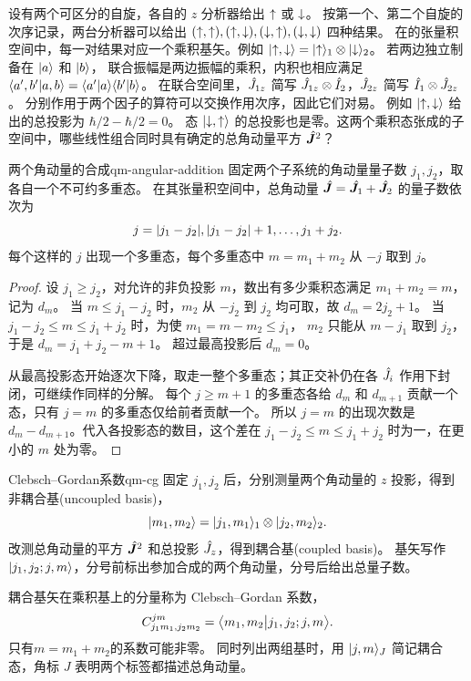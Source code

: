 设有两个可区分的自旋，各自的 $z$ 分析器给出 $\mathord{\uparrow}$ 或 $\mathord{\downarrow}$。
按第一个、第二个自旋的次序记录，两台分析器可以给出 $(\mathord{\uparrow},\mathord{\uparrow}),(\mathord{\uparrow},\mathord{\downarrow}),(\mathord{\downarrow},\mathord{\uparrow}),(\mathord{\downarrow},\mathord{\downarrow})$ 四种结果。
在的张量积空间中，每一对结果对应一个乘积基矢。例如 $\lvert\mathord{\uparrow},\mathord{\downarrow}\rangle = \lvert\mathord{\uparrow}\rangle_1 \otimes \lvert\mathord{\downarrow}\rangle_2$。
若两边独立制备在 $\lvert a\rangle$ 和 $\lvert b\rangle$，
联合振幅是两边振幅的乘积，内积也相应满足
$\langle a',b'\vert a,b\rangle = \langle a'\vert a\rangle\langle b'\vert b\rangle$。
在联合空间里，$\hat{J}_{1z}$ 简写 $\hat{J}_{1z} \otimes \hat{I}_2$，$\hat{J}_{2z}$ 简写 $\hat{I}_1 \otimes \hat{J}_{2z}$。
分别作用于两个因子的算符可以交换作用次序，因此它们对易。
例如 $\lvert\mathord{\uparrow},\mathord{\downarrow}\rangle$ 给出的总投影为 $\hbar/2 - \hbar/2 = 0$。
态 $\lvert\mathord{\downarrow},\mathord{\uparrow}\rangle$ 的总投影也是零。这两个乘积态张成的子空间中，哪些线性组合同时具有确定的总角动量平方 $\hat{\bm{J}}^2$？
\begin{theorem}{两个角动量的合成}{qm-angular-addition}
    固定两个子系统的角动量量子数 $j_1,j_2$，取各自一个不可约多重态。
    在其张量积空间中，总角动量 $\hat{\bm{J}} = \hat{\bm{J}}_1 + \hat{\bm{J}}_2$ 的量子数依次为
    \begin{equation}
        j = \lvert j_1 - j_2\rvert,\lvert j_1 - j_2\rvert + 1,\ldots,j_1 + j_2 .
    \end{equation}
    每个这样的 $j$ 出现一个多重态，每个多重态中 $m = m_1 + m_2$ 从 $-j$ 取到 $j$。
\end{theorem}
\begin{proof}
    设 $j_1 \geq j_2$，对允许的非负投影 $m$，数出有多少乘积态满足 $m_1 + m_2 = m$，记为 $d_m$。
    当 $m \leq j_1 - j_2$ 时，$m_2$ 从 $-j_2$ 到 $j_2$ 均可取，故 $d_m = 2j_2 + 1$。
    当 $j_1 - j_2 \leq m \leq j_1 + j_2$ 时，为使 $m_1 = m - m_2 \leq j_1$，
    $m_2$ 只能从 $m - j_1$ 取到 $j_2$，于是 $d_m = j_1 + j_2 - m + 1$。
    超过最高投影后 $d_m = 0$。

    从最高投影态开始逐次下降，取走一整个多重态；其正交补仍在各 $\hat{J}_i$ 作用下封闭，可继续作同样的分解。
    每个 $j \geq m + 1$ 的多重态各给 $d_m$ 和 $d_{m+1}$ 贡献一个态，只有 $j = m$ 的多重态仅给前者贡献一个。
    所以 $j = m$ 的出现次数是 $d_m - d_{m+1}$。代入各投影态的数目，这个差在 $j_1 - j_2 \leq m \leq j_1 + j_2$ 时为一，在更小的 $m$ 处为零。
\end{proof}

\begin{definition}{Clebsch--Gordan系数}{qm-cg}
    固定 $j_1,j_2$ 后，分别测量两个角动量的 $z$ 投影，得到非耦合基(uncoupled basis)，
    \begin{equation}\label{eq:qm-uncoupled-angular-momentum-basis}
        \lvert m_1,m_2\rangle = \lvert j_1,m_1\rangle_1 \otimes \lvert j_2,m_2\rangle_2 .
    \end{equation}
    改测总角动量的平方 $\hat{\bm{J}}^2$ 和总投影 $\hat{J}_z$，得到耦合基(coupled basis)。
    基矢写作 $\lvert j_1,j_2;j,m\rangle$，分号前标出参加合成的两个角动量，分号后给出总量子数。

    耦合基矢在乘积基上的分量称为 Clebsch--Gordan 系数，
    \begin{equation}
        C^{jm}_{j_1m_1,j_2m_2}
        = \bigl\langle m_1,m_2\big\vert j_1,j_2;j,m\bigr\rangle.
    \end{equation}
    只有$m = m_1 + m_2$的系数可能非零。
    同时列出两组基时，用 $\lvert j,m\rangle_J$ 简记耦合态，角标 $J$ 表明两个标签都描述总角动量。
\end{definition}

